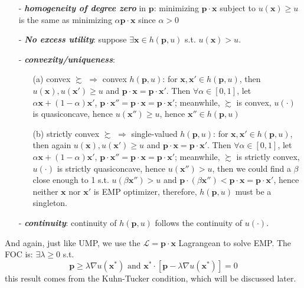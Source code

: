 \begin{enumerate}
    \item[-] \textit{\textbf{homogeneity of degree zero}} in $\mathbf{p}$: minimizing $\mathbf{p}\cdot\mathbf{x}$ subject to $u(\mathbf{x})\geq u$ is the same as minimizing $\alpha \mathbf{p}\cdot\mathbf{x}$ since $\alpha >0$
    \item[-] \textit{\textbf{No excess utility}}: suppose $\exists \mathbf{x}\in h(\mathbf{p},u)$ s.t. $u(\mathbf{x})>u$. 
    \item[-] \textit{\textbf{convexity/uniqueness}}:
    \begin{enumerate}
        \item[(a)] convex $\succsim$ $\Rightarrow$ convex $ h(\mathbf{p},u)$: for $\mathbf{x},\mathbf{x}'\in h(\mathbf{p},u)$, then $u(\mathbf{x}),u(\mathbf{x}')\geq u$ and $\mathbf{p}\cdot\mathbf{x}=\mathbf{p}\cdot\mathbf{x}'$. Then $\forall \alpha\in[0,1]$, let $\alpha\mathbf{x}+(1-\alpha)\mathbf{x}'$, $\mathbf{p}\cdot\mathbf{x}''=\mathbf{p}\cdot\mathbf{x}=\mathbf{p}\cdot\mathbf{x}'$; meanwhile, $\succsim$ is convex, $u(\cdot)$ is quasiconcave, hence $u(\mathbf{x}'')\geq u$, hence $\mathbf{x}''\in h(\mathbf{p},u)$
        \item[(b)] strictly convex $\succsim$ $\Rightarrow$ single-valued $ h(\mathbf{p},u)$: for $\mathbf{x},\mathbf{x}'\in h(\mathbf{p},u)$, then again $u(\mathbf{x}),u(\mathbf{x}')\geq u$ and $\mathbf{p}\cdot\mathbf{x}=\mathbf{p}\cdot\mathbf{x}'$. Then $\forall \alpha\in[0,1]$, let $\alpha\mathbf{x}+(1-\alpha)\mathbf{x}'$, $\mathbf{p}\cdot\mathbf{x}''=\mathbf{p}\cdot\mathbf{x}=\mathbf{p}\cdot\mathbf{x}'$; meanwhile, $\succsim$ is strictly convex, $u(\cdot)$ is strictly quasiconcave, hence $u(\mathbf{x}'')> u$, then we could find a $\beta$ close enough to 1 s.t. $u(\beta\mathbf{x}'')>u$ and $\mathbf{p}\cdot(\beta \mathbf{x}'')<\mathbf{p}\cdot \mathbf{x}=\mathbf{p}\cdot \mathbf{x}'$, hence neither $\mathbf{x}$ nor $\mathbf{x}'$ is EMP optimizer, therefore, $h(\mathbf{p},u)$ must be a singleton.
    \end{enumerate}
    \item[-] \textit{\textbf{continuity}}: continuity of $h(\mathbf{p},u)$ follows the continuity of $u(\cdot)$.
\end{enumerate}

And again, just like UMP, we use the $\mathcal{L}=\mathbf{p}\cdot\mathbf{x}$ Lagrangean to solve EMP. The FOC is: $\exists \lambda \geq 0$ s.t.
$$\mathbf{p}\geq \lambda\nabla u(\mathbf{x}^*)\text{ and }\mathbf{x}^*\cdot[\mathbf{p}-\lambda \nabla u(\mathbf{x}^*)]=0$$
this result comes from the Kuhn-Tucker condition, which will be discussed later.

